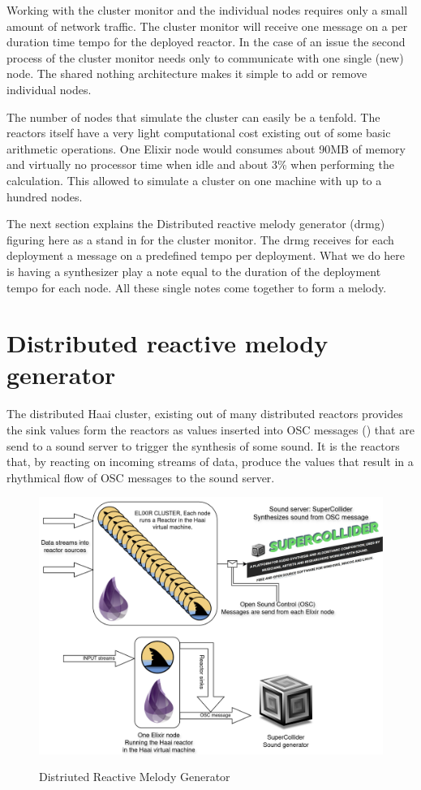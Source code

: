 \documentclass[a4paper]{book}
\begin{document}
Working with the cluster monitor and the individual nodes requires only a small amount of network traffic. The cluster monitor will receive one message on a per duration time tempo for the deployed reactor. In the case of an issue the second process of the cluster monitor needs only to communicate with one single (new) node. The shared nothing architecture makes it simple to add or remove individual nodes.

The number of nodes that simulate the cluster can easily be a tenfold. The reactors itself have a very light computational cost existing out of some basic arithmetic operations. One Elixir node would consumes about 90MB of memory and virtually no processor time when idle and about 3\% when performing the calculation. This allowed to simulate a cluster on one machine with up to a hundred nodes. 

The next section explains the Distributed reactive melody generator (drmg) figuring here as a stand in for the cluster monitor. The drmg receives for each deployment a message on a predefined tempo per deployment. What we do here is having a synthesizer play a note equal to the duration of the deployment tempo for each node. All these single notes come together to form a melody. 
  

\section{Distributed reactive melody generator}
The distributed Haai cluster, existing out of many distributed reactors provides the sink values form the reactors as values inserted into OSC messages (\cite{schmeder2010best}) that are send to a sound server to trigger the synthesis of some sound. It is the reactors that, by reacting on incoming streams of data, produce the values that result in a rhythmical flow of OSC messages to the sound server. 

\begin{figure}[h]
	\caption{Distriuted Reactive Melody Generator}
	\includegraphics[width=\textwidth]{drmg200.drawio}
	\label{fig:drmg}
\end{figure}
 
\end{document}
